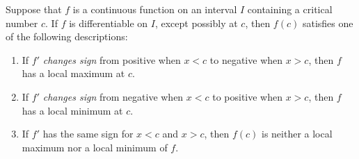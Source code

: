 \documentclass[../main.tex]{subfiles}
\begin{document}
\clearpage

\begin{thm} \label{thm:first-derivative-test}
  Suppose that \(f\) is a continuous function on an interval \(I\) containing a critical number \(c\). If \(f\) is differentiable on \(I\), except possibly at \(c\), then \(f(c)\) satisfies one of the following descriptions:

    \begin{enumerate}
      \item If \(f'\) \emph{changes sign} from positive when \(x < c\) to negative when \(x > c\), then \(f\) has a local maximum at \(c\).

        \begin{center}
          
        \end{center}

      \item If \(f'\) \emph{changes sign} from negative when \(x < c\) to positive when \(x > c\), then \(f\) has a local minimum at \(c\).

        \begin{center}
          
        \end{center}

      \item If \(f'\) has the same sign for \(x < c\) and \(x > c\), then \(f(c)\) is neither a local maximum nor a local minimum of \(f\).

        \begin{center}
          
          \qquad
          \qquad
          
        \end{center}

    \end{enumerate}

\end{thm}
\end{document}

